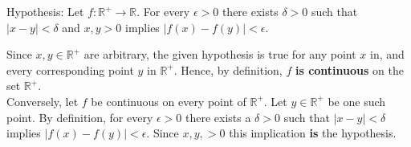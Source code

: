 \documentclass[boxes, qed]{homework}
\begin{document}
\begin{problem}Hypothesis: Let $f:\mathbb{R}^+\to\mathbb{R}$. For every $\epsilon>0$ there
  exists $\delta>0$ such that $|x-y|<\delta$ and $x,y>0$ implies $|f(x)-f(y)|<\epsilon$.
\end{problem}
\begin{solution}Since $x,y\in\mathbb{R}^+$ are arbitrary, the given hypothesis is true
  for any point $x$ in, and every corresponding point $y$ in $\mathbb{R}^+$. 
  Hence, by definition, $f$ \textbf{is continuous} on the set $\mathbb{R}^+$.\\

  Conversely, let $f$ be continuous on every point of $\mathbb{R}^+$. 
  Let $y\in\mathbb{R}^+$ be one such point. By definition, for every $\epsilon>0$
  there exists a $\delta>0$ such that $|x-y|<\delta$ implies $|f(x)-f(y)|<\epsilon$.
  Since $x,y,>0$ this implication \textbf{is} the hypothesis.
\end{solution}
\end{document}
